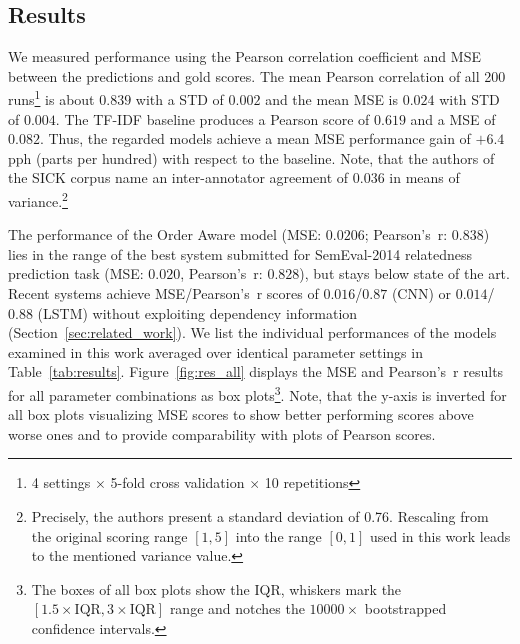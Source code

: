 \subsection{Results}
We measured performance using the Pearson correlation coefficient and \ac{MSE} between the predictions and gold scores. The mean Pearson correlation of all 200 runs\footnote{4 settings $\times$ 5-fold cross validation $\times$ 10 repetitions} is about $0.839$ %
with a \ac{STD} of $0.002$ and the mean \ac{MSE} is $0.024$ with \ac{STD} of $0.004$. The \ac{TF-IDF} baseline produces a Pearson score of $0.619$ and a \ac{MSE} of $0.082$. Thus, the regarded models achieve a mean \ac{MSE} performance gain of $+6.4$ pph (parts per hundred) with respect to the baseline. Note, that the authors of the SICK corpus name an inter-annotator agreement of 0.036 in means of variance.\footnote{Precisely, the authors present a standard deviation of 0.76. Rescaling from the original scoring range $[1, 5]$ into the range $[0, 1]$ used in this work leads to the mentioned variance value.} 

The performance of the Order Aware model (MSE: $0.0206$; Pearson's~r: $0.838$) lies in the range of the best system submitted for SemEval-2014 relatedness prediction task (MSE: $0.020$, Pearson's~r: $0.828$), but stays below state of the art. Recent systems achieve MSE/Pearson's~r scores of $0.016$/$0.87$ \autocite{he_multi-perspective_2015}(CNN) or $0.014$/$0.88$ \autocite{mueller_siamese_2016}(LSTM) without exploiting dependency information (Section~\ref{sec:related_work}). We list the individual performances of the models examined in this work averaged over identical parameter settings in Table~\ref{tab:results}. Figure~\ref{fig:res_all} displays the \ac{MSE} and Pearson's~r results for all parameter combinations as box plots\footnote{The boxes of all box plots show the \ac{IQR}, whiskers mark the $[1.5\times \text{IQR}, 3\times \text{IQR}]$ range and notches the  $10000\times$ bootstrapped confidence intervals.}. Note, that the y-axis is inverted for all box plots visualizing \ac{MSE} scores to show better performing scores above worse ones and to provide comparability with plots of Pearson scores. 


